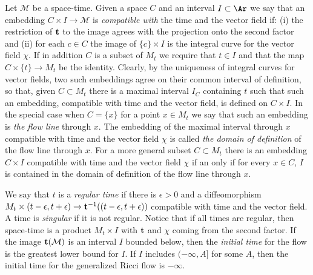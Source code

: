 \begin{definition}\label{def:compatible-embedding}

Let ${\mathcal M}$ be a space-time. Given a space $C$ and an
interval $I\subset \Ar$  we say that an embedding $C\times I\to
{\mathcal M}$ is {\em compatible with} the time and the vector field
if: (i) the restriction of ${\bf t}$ to the image agrees with the
projection onto the second factor and (ii) for each $c\in C$ the
image of $\{c\}\times I$ is the integral curve for the vector field
$\chi$.
 If in addition $C$ is a subset of $M_{t}$
we require that $t\in I$ and that the map $C\times\{t\}\to M_{t}$ be
the identity. Clearly, by the uniqueness of integral curves for vector fields,
 two such embeddings agree on their common interval of definition, so that,
given $C\subset M_{t}$ there is a maximal interval $I_C$ containing
$t$ such that such an embedding, compatible with time and the vector field,
 is defined on $C\times I$. In the
special case when $C=\{x\}$ for a point $x\in M_{t}$ we say that
such an embedding is {\em the flow line} through $x$. The embedding
of the maximal interval through $x$ compatible with time and the vector
field $\chi$ is called {\em the domain of definition} of the flow
line through $x$. For a more general subset $C\subset M_{t}$ there
is an embedding $C\times I$ compatible with time and the vector
field $\chi$ if an only if for every $x\in C$, $I$ is contained in
the domain of definition of the flow line through $x$.
\end{definition}


\begin{definition}\label{def:regular-singular-time}

We say that $t$ is a {\em regular time} if there is $\epsilon>0$ and
a diffeomorphism $M_{t}\times (t-\epsilon,t+\epsilon)\to {\bf
t}^{-1}((t-\epsilon,t+\epsilon))$ compatible with time
and the vector field. A time is {\em singular} if it is not regular.
Notice that if all times are regular, then space-time is a product
$M_{t}\times I$ with ${\bf t}$ and $\chi$ coming from the second
factor. If the image ${\bf t}({\mathcal M})$ is an interval $I$
bounded below, then the {\em initial time} for the flow is the
greatest lower bound for $I$. If $I$ includes $(-\infty,A]$ for some
$A$, then the initial time for the generalized Ricci flow is
$-\infty$.
\end{definition}



